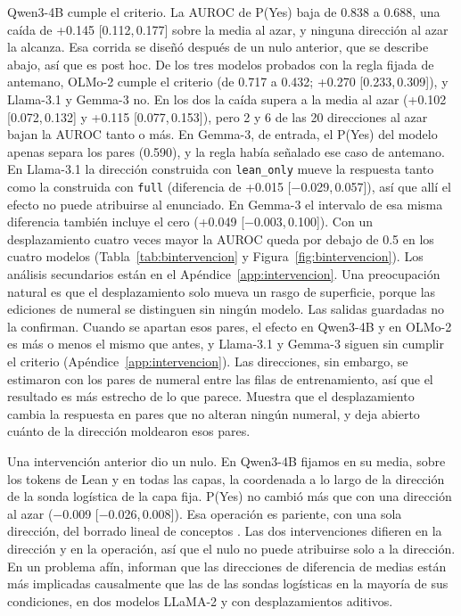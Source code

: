 \documentclass[10pt]{article}
\newcommand{\vr}[1]{\texttt{#1}}
\newcommand{\ic}[2]{[#1,\,#2]}
\begin{document}
Qwen3-4B cumple el criterio. La AUROC de P(Yes) baja de 0.838 a 0.688, una caída de +0.145 \ic{0.112}{0.177} sobre la media al
azar, y ninguna dirección al azar la alcanza. Esa corrida se diseñó después de un nulo anterior, que se describe
abajo, así que es post hoc. De los tres modelos probados con la regla fijada de antemano, OLMo-2 cumple el criterio
(de 0.717 a 0.432; +0.270 \ic{0.233}{0.309}), y Llama-3.1 y Gemma-3 no. En los dos la caída supera a la media al azar
(+0.102 \ic{0.072}{0.132} y +0.115 \ic{0.077}{0.153}), pero 2 y 6 de las 20 direcciones al azar bajan la AUROC tanto o
más. En Gemma-3, de entrada, el P(Yes) del modelo apenas separa los pares (0.590), y la regla había señalado ese caso de
antemano. En Llama-3.1 la dirección construida con \vr{lean\_only} mueve la respuesta tanto como la construida con
\vr{full} (diferencia de +0.015 \ic{−0.029}{0.057}), así que allí el efecto no puede atribuirse al enunciado.
En Gemma-3 el intervalo de esa misma diferencia también incluye el cero (+0.049 \ic{−0.003}{0.100}).
Con un desplazamiento cuatro veces mayor la AUROC queda por debajo de 0.5 en los cuatro modelos
(Tabla~\ref{tab:bintervencion} y Figura~\ref{fig:bintervencion}). Los análisis
secundarios están en el Apéndice~\ref{app:intervencion}.
Una preocupación natural es que el desplazamiento solo mueva un rasgo de superficie, porque las ediciones de numeral
se distinguen sin ningún modelo. Las salidas guardadas no la confirman. Cuando se apartan esos pares, el efecto en Qwen3-4B y
en OLMo-2 es más o menos el mismo que antes, y Llama-3.1 y Gemma-3 siguen sin cumplir el criterio
(Apéndice~\ref{app:intervencion}). Las direcciones, sin embargo, se estimaron con los pares de numeral entre las filas
de entrenamiento, así que el resultado es más estrecho de lo que parece. Muestra que el desplazamiento cambia la
respuesta en pares que no alteran ningún numeral, y deja abierto cuánto de la dirección moldearon esos pares.

Una intervención anterior dio un nulo. En Qwen3-4B fijamos en su media, sobre los tokens de Lean y en todas las capas,
la coordenada a lo largo de la dirección de la sonda logística de la capa fija. P(Yes) no cambió más que con una
dirección al azar (−0.009 \ic{−0.026}{0.008}). Esa operación es pariente, con una sola dirección, del borrado lineal
de conceptos \citep{ravfogel2020null,belrose2023leace}. Las dos intervenciones difieren en la dirección y en la
operación, así que el nulo no puede atribuirse solo a la dirección. En un problema afín, \citet{geometry} informan que
las direcciones de diferencia de medias están más implicadas causalmente que las de las sondas logísticas en la
mayoría de sus condiciones, en dos modelos LLaMA-2 y con desplazamientos aditivos.
\end{document}
